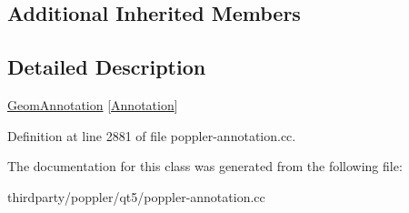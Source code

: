 \subsection*{Additional Inherited Members}


\subsection{Detailed Description}
\hyperlink{class_poppler_1_1_geom_annotation}{Geom\+Annotation} \mbox{[}\hyperlink{class_poppler_1_1_annotation}{Annotation}\mbox{]} 

Definition at line 2881 of file poppler-\/annotation.\+cc.



The documentation for this class was generated from the following file\+:\begin{DoxyCompactItemize}
\item 
thirdparty/poppler/qt5/poppler-\/annotation.\+cc\end{DoxyCompactItemize}
